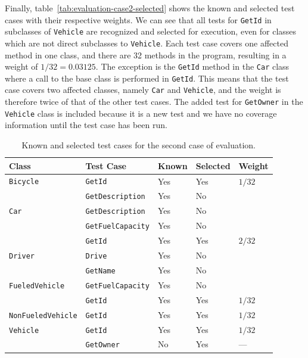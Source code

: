 \documentclass[a4paper,english,12pt]{report}
\newcommand{\textcf}{\texttt}
\begin{document}
Finally, table~\vref{tab:evaluation-case2-selected} shows the known and selected test cases with their respective weights. We can see that all tests for \textcf{GetId} in subclasses of \textcf{Vehicle} are recognized and selected for execution, even for classes which are not direct subclasses to \textcf{Vehicle}. Each test case covers one affected method in one class, and there are 32 methods in the program, resulting in a weight of $1/32=0.03125$. The exception is the \textcf{GetId} method in the \textcf{Car} class where a call to the base class is performed in \textcf{GetId}. This means that the test case covers two affected classes, namely \textcf{Car} and \textcf{Vehicle}, and the weight is therefore twice of that of the other test cases. The added test for \textcf{GetOwner} in the \textcf{Vehicle} class is included because it is a new test and we have no coverage information until the test case has been run.

\begin{table}[htbp]
  \centering
  \begin{tabular}{|l|l|l|l|l|}
    \hline
    \textbf{Class} & \textbf{Test Case} & \textbf{Known} & \textbf{Selected} & \textbf{Weight}\\
    \hline
    \textcf{Bicycle} & \textcf{GetId} & Yes & Yes & $1/32$\\
            & \textcf{GetDescription} & Yes & No &\\
    \hline
    \textcf{Car} & \textcf{GetDescription} & Yes & No &\\
        & \textcf{GetFuelCapacity} & Yes & No &\\
        & \textcf{GetId} & Yes & Yes & $2/32$\\
    \hline
    \textcf{Driver} & \textcf{Drive} & Yes & No &\\
           & \textcf{GetName} & Yes & No &\\
    \hline
    \textcf{FueledVehicle} & \textcf{GetFuelCapacity} & Yes & No &\\
                  & \textcf{GetId} & Yes & Yes & $1/32$\\
    \hline
    \textcf{NonFueledVehicle} & \textcf{GetId} & Yes & Yes & $1/32$\\
    \hline
    \textcf{Vehicle} & \textcf{GetId} & Yes & Yes & $1/32$\\
            & \textcf{GetOwner} & No & Yes & ---\\
    \hline
  \end{tabular}
  \caption{Known and selected test cases for the second case of evaluation.}
  \label{tab:evaluation-case2-selected}
\end{table}
\end{document}
